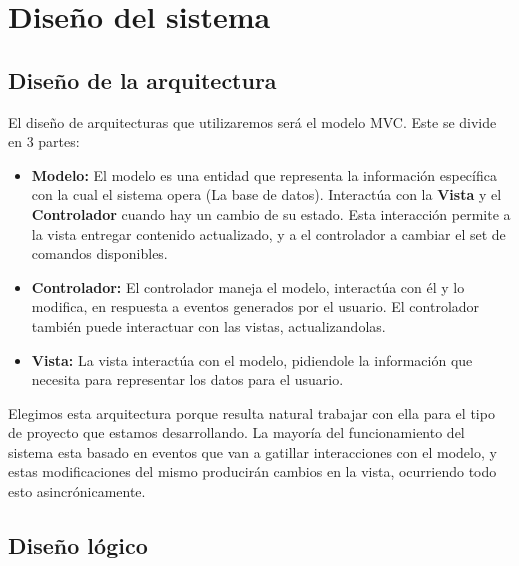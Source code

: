 \documentclass[a4paper,11pt]{article}
\begin{document}
\newpage

\section{Diseño del sistema}
\subsection{Diseño de la arquitectura}
	El diseño de arquitecturas que utilizaremos será el modelo MVC. 
Este se divide en 3 partes:
\begin{itemize}
	\item \textbf{Modelo:} El modelo es una entidad que representa la 
información específica con la cual el sistema opera (La base de datos). 
Interactúa con la \textbf{Vista} y el \textbf{Controlador} cuando hay un cambio
de su estado. Esta interacción permite a la vista entregar contenido actualizado, 
y a el controlador a cambiar el set de comandos disponibles. \\
	\item \textbf{Controlador:} El controlador maneja el modelo, 
interactúa con él y lo modifica, en respuesta a  eventos generados por el 
usuario. El controlador también puede interactuar con las vistas, 
actualizandolas. \\
	\item \textbf{Vista:} La vista interactúa con el modelo, pidiendole la
información que necesita para representar los datos para el usuario. \\
\end{itemize}

Elegimos esta arquitectura porque resulta natural trabajar con ella 
para el tipo de proyecto que estamos desarrollando. La mayoría del 
funcionamiento del sistema esta basado en eventos que van a gatillar 
interacciones con el modelo, y estas modificaciones del mismo producirán 
cambios en la vista, ocurriendo todo esto asincrónicamente.
\newpage
\subsection{Diseño lógico}
\end{document}
